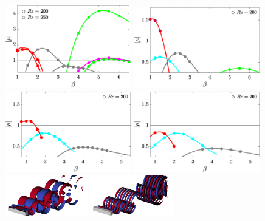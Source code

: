 \documentclass{jfm}
\begin{document}
\begin{figure}
  \centering
  \includegraphics[width=0.49\textwidth]{./fig/AR1s/multipliers_AR1.eps}
  \includegraphics[width=0.49\textwidth]{./fig/AR1s/multipliers_AR1p25.eps}
  \includegraphics[width=0.49\textwidth]{./fig/AR1s/multipliers_AR1p5.eps}
  \includegraphics[width=0.49\textwidth]{./fig/AR1s/multipliers_AR1p75.eps} \\
  \includegraphics[width=0.32\textwidth]{./fig/AR1s/Floqetmode_beta_1p2_Re200_AR1_A.png}
  \includegraphics[width=0.32\textwidth]{./fig/AR1s/Floqetmode_beta_3p75_Re200_AR1_C.png}      

\end{figure}
\end{document}
